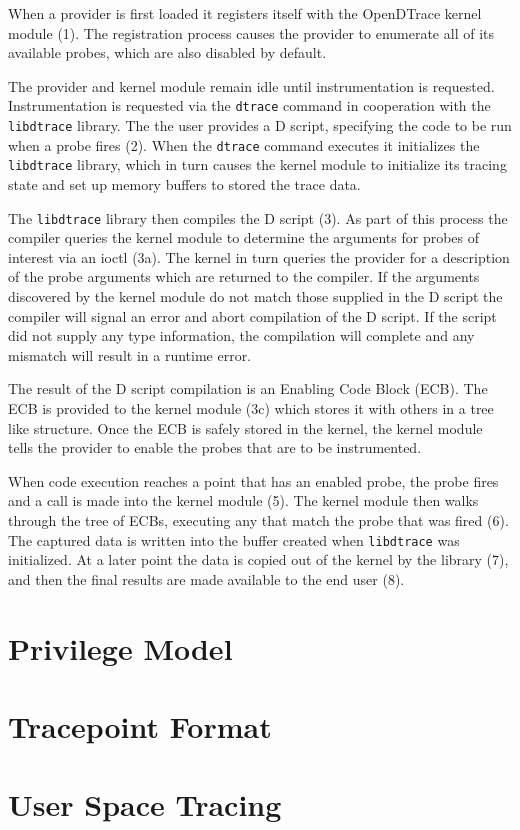 When a provider is first loaded it registers itself with the
OpenDTrace kernel module (1). The registration process causes the
provider to enumerate all of its available probes, which are also
disabled by default.

The provider and kernel module remain idle until instrumentation is
requested. Instrumentation is requested via the \texttt{dtrace}
command in cooperation with the \texttt{libdtrace} library.  The the
user provides a D script, specifying the code to be run when a probe
fires (2). When the \texttt{dtrace} command executes it initializes
the \texttt{libdtrace} library, which in turn causes the kernel module
to initialize its tracing state and set up memory buffers to stored
the trace data.

The \texttt{libdtrace} library then compiles the D script (3). As part
of this process the compiler queries the kernel module to determine
the arguments for probes of interest via an ioctl (3a). The kernel in
turn queries the provider for a description of the probe arguments
which are returned to the compiler.  If the arguments discovered by
the kernel module do not match those supplied in the D script the
compiler will signal an error and abort compilation of the D script.
If the script did not supply any type information, the compilation
will complete and any mismatch will result in a runtime error.

The result of the D script compilation is an Enabling Code Block
(ECB). The ECB is provided to the kernel module (3c) which stores it
with others in a tree like structure. Once the ECB is safely stored in
the kernel, the kernel module tells the provider to enable the probes
that are to be instrumented.

When code execution reaches a point that has an enabled probe, the
probe fires and a call is made into the kernel module (5). The kernel
module then walks through the tree of ECBs, executing any that match
the probe that was fired (6). The captured data is written into the
buffer created when \texttt{libdtrace} was initialized. At a later
point the data is copied out of the kernel by the library (7), and
then the final results are made available to the end user (8).

\section{Privilege Model}
\label{sec:privilege}

\section{Tracepoint Format}
\label{sec:tracepoint-format}

\section{User Space Tracing}
\label{sec:user-space}

